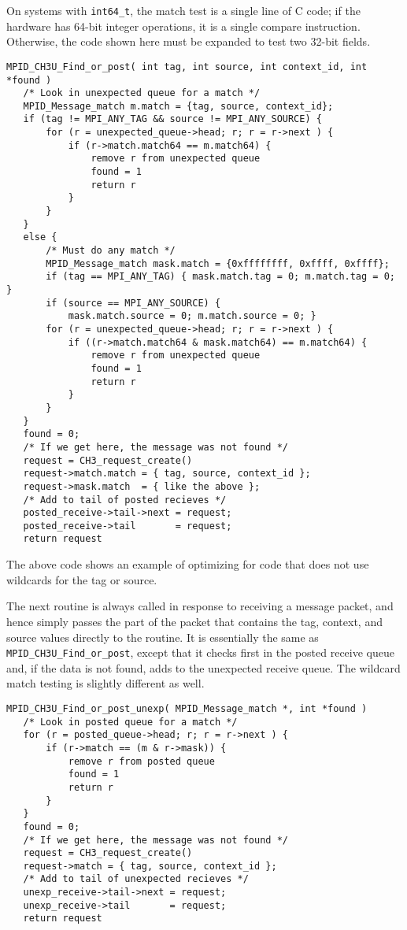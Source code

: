 \documentclass{article}
\def\code{\begingroup\makeustext\eatcode}
\def\eatcode#1{\texttt{#1}\endgroup}
\begin{document}
On systems with \code{int64_t}, the match test is a single line of C code; if
the hardware has 64-bit integer operations, it is a single compare
instruction.  Otherwise, the code shown here must be expanded to test
two 32-bit fields.  

\begin{verbatim}
MPID_CH3U_Find_or_post( int tag, int source, int context_id, int *found )
   /* Look in unexpected queue for a match */
   MPID_Message_match m.match = {tag, source, context_id};
   if (tag != MPI_ANY_TAG && source != MPI_ANY_SOURCE) {
       for (r = unexpected_queue->head; r; r = r->next ) {
           if (r->match.match64 == m.match64) {
               remove r from unexpected queue
               found = 1
               return r
           }
       }
   }
   else {
       /* Must do any match */
       MPID_Message_match mask.match = {0xffffffff, 0xffff, 0xffff};
       if (tag == MPI_ANY_TAG) { mask.match.tag = 0; m.match.tag = 0; }
       if (source == MPI_ANY_SOURCE) { 
           mask.match.source = 0; m.match.source = 0; }
       for (r = unexpected_queue->head; r; r = r->next ) {
           if ((r->match.match64 & mask.match64) == m.match64) {
               remove r from unexpected queue
               found = 1
               return r
           }
       }
   }
   found = 0;
   /* If we get here, the message was not found */
   request = CH3_request_create()
   request->match.match = { tag, source, context_id };
   request->mask.match  = { like the above };
   /* Add to tail of posted recieves */
   posted_receive->tail->next = request;
   posted_receive->tail       = request;
   return request
\end{verbatim}
The above code shows an example of optimizing for code that does not
use wildcards for the tag or source.  

The next routine is always called in response to receiving a message packet,
and hence simply passes the part of the packet that contains the tag, context,
and source values directly to the routine.  It is essentially the same as 
\code{MPID_CH3U_Find_or_post}, except that it checks first in the posted
receive queue and, if the data is not found, adds to the unexpected receive
queue.  The wildcard match testing is slightly different as well.
\begin{verbatim}
MPID_CH3U_Find_or_post_unexp( MPID_Message_match *, int *found )
   /* Look in posted queue for a match */
   for (r = posted_queue->head; r; r = r->next ) {
       if (r->match == (m & r->mask)) {
           remove r from posted queue
           found = 1
           return r
       }
   }
   found = 0;
   /* If we get here, the message was not found */
   request = CH3_request_create()
   request->match = { tag, source, context_id };
   /* Add to tail of unexpected recieves */
   unexp_receive->tail->next = request;
   unexp_receive->tail       = request;
   return request
\end{verbatim}
\end{document}
